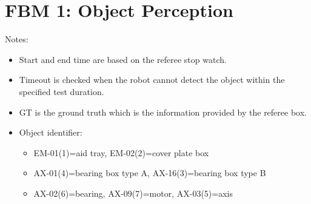 \section*{FBM 1: Object Perception}


\noindent Notes:
\begin{itemize}
\item Start and end time are based on the referee stop watch.
\item Timeout is checked when the robot cannot detect the object within the specified test duration.
\item GT is the ground truth which is the information provided by the referee box.
\item Object identifier:
	\begin{itemize}
		\item EM-01(1)=aid tray, EM-02(2)=cover plate box
		\item AX-01(4)=bearing box type A, AX-16(3)=bearing box type B
		\item AX-02(6)=bearing, AX-09(7)=motor, AX-03(5)=axis
	\end{itemize}
\end{itemize}

\vspace{0.5cm}

\\

\newpage
{}\\
\\
\\

\newpage
{}\\
\\
\\

\newpage
{}\\
\\


